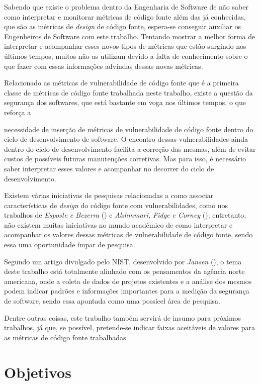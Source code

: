 Sabendo que existe o problema dentro da Engenharia de Software de não saber como
interpretar e monitorar métricas de código fonte além das já conhecidas, que são 
as métricas de \textit{design} de código fonte, espera-se conseguir auxiliar os 
Engenheiros de Software com este trabalho. Tentando mostrar a melhor forma de 
interpretar e acompanhar esses novos tipos de métricas que estão surgindo nos últimos
tempos, muitos não as utilizam devido a falta de conhecimento sobre o que fazer
com essas informações advindas dessas novas métricas.

Relacionado as métricas de vulnerabilidade de código fonte que é a primeira
classe de métricas de código fonte trabalhada neste trabalho, existe a
questão da segurança dos softwares, que está bastante em voga nos últimos
tempos, o que reforça a

 necessidade de inserção de métricas de vulnerabilidade
de código fonte dentro do ciclo de desenvolvimento de software. O encontro
dessas vulnerabilidades ainda dentro do ciclo de desenvolvimento facilita a
correção das mesmas, além de evitar custos de possíveis futuras manutenções
corretivas. Mas para isso, é necessário saber interpretar esses valores
e acompanhar no decorrer do ciclo de desenvolvimento.

Existem várias iniciativas de pesquisas relacionadas a como associar
características de \textit{design} do código fonte com vulnerabilidades, como
nos trabalhos de \emph{Esposte e Bezerra} (\citeyear{arthur&carlos2014}) e
\emph{Alshmmari, Fidge e Corney} (\citeyear{alshammari2009}); entretanto, não
existem muitas iniciativas no mundo acadêmico de como interpretar e acompanhar
os valores dessas métricas de vulnerabilidade de código fonte, sendo essa uma
oportunidade ímpar de pesquisa.

Segundo um artigo divulgado pelo NIST, desenvolvido por \emph{Jansen}
(\citeyear{jansen2009}), o tema deste trabalho está totalmente alinhado com os
pensamentos da agência norte americana, onde a coleta de dados de projetos
existentes e a análise dos mesmos podem indicar padrões e informações
importantes para a medição da segurança de software, sendo essa apontada como
uma possícel área de pesquisa.

Dentre outras coisas, este trabalho também servirá de insumo para próximos
trabalhos, já que, se possível, pretende-se indicar faixas aceitáveis de valores 
para as métricas de código fonte trabalhadas.

\section{Objetivos} \label{sec:objetivos}

